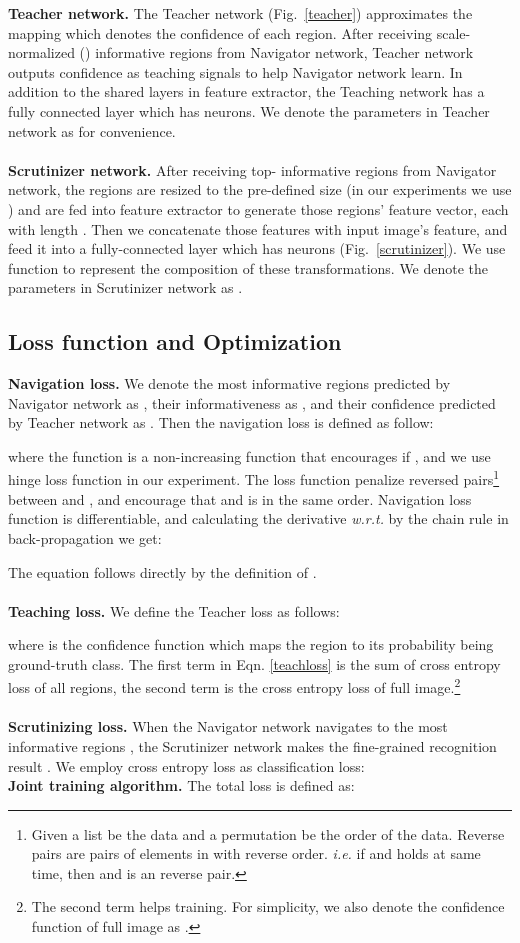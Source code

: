 \documentclass[runningheads]{llncs}
\begin{document}
\textbf{Teacher network.}
The Teacher network (Fig.~\ref{teacher}) approximates the mapping  which denotes the confidence of each region. After receiving  scale-normalized () informative regions  from Navigator network, Teacher network outputs confidence as teaching signals to help Navigator network learn. In addition to the shared layers in feature extractor, the Teaching network has a fully connected layer which has  neurons. We denote the parameters in Teacher network as  for convenience.\\\\
\textbf{Scrutinizer network.}
After receiving top- informative regions from Navigator network, the  regions are resized to the pre-defined size (in our experiments we use ) and are fed into feature extractor to generate those  regions' feature vector, each with length . Then we concatenate those  features with input image's feature, and feed it into a fully-connected layer which has  neurons (Fig.~\ref{scrutinizer}).  We use function  to represent the composition of these transformations. We denote the parameters in Scrutinizer network as . 

\subsection{Loss function and Optimization}\label{sec_loss}
\textbf{Navigation loss.}
We denote the  most informative regions predicted by Navigator network as , their informativeness as , and their confidence predicted by Teacher network as . Then the navigation loss is defined as follow:

where the function  is a non-increasing function that encourages  if , and we use hinge loss function  in our experiment. The loss function penalize reversed pairs\footnote{Given a list  be the data and a permutation  be the order of the data. Reverse pairs are pairs of elements in  with reverse order. \emph{i.e.} if  and  holds at same time, then  and  is an reverse pair.} between  and , and encourage that  and  is in the same order. Navigation loss function is differentiable, and calculating the derivative \emph{w.r.t.}  by the chain rule in back-propagation we get:


The equation follows directly by the definition of .\\\\
\textbf{Teaching loss.}
We define the Teacher loss  as follows:


where  is the confidence function which maps the region to its probability being ground-truth class. The first term in Eqn. \ref{teachloss} is the sum of cross entropy loss of all regions, the second term is the cross entropy loss of full image.\footnote{The second term helps training. For simplicity, we also denote the confidence function of full image as . }\\\\
\textbf{Scrutinizing loss.}
When the Navigator network navigates to the most informative regions , the Scrutinizer network makes the fine-grained recognition result . We employ cross entropy loss as classification loss:
\\
\textbf{Joint training algorithm.} 
The total loss is defined as:
\end{document}
